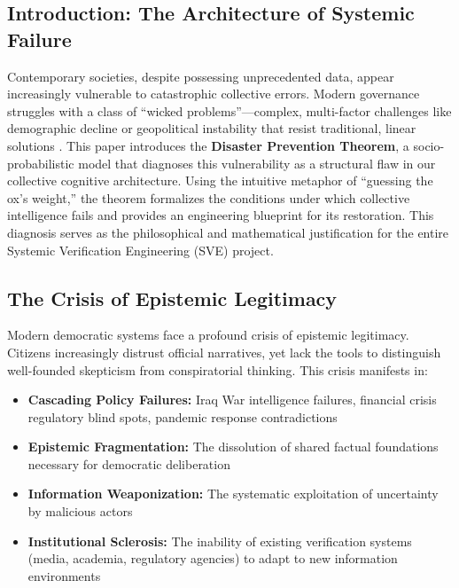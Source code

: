 \documentclass[11pt,a4paper]{article}
\begin{document}
\begin{small}

\section{Introduction: The Architecture of Systemic Failure}

Contemporary societies, despite possessing unprecedented data, appear increasingly vulnerable to catastrophic collective errors. Modern governance struggles with a class of ``wicked problems''---complex, multi-factor challenges like demographic decline or geopolitical instability that resist traditional, linear solutions \citep{Rittel1973}. This paper introduces the \textbf{Disaster Prevention Theorem}, a socio-probabilistic model that diagnoses this vulnerability as a structural flaw in our collective cognitive architecture. Using the intuitive metaphor of ``guessing the ox's weight,'' the theorem formalizes the conditions under which collective intelligence fails and provides an engineering blueprint for its restoration. This diagnosis serves as the philosophical and mathematical justification for the entire Systemic Verification Engineering (SVE) project.

\subsection{The Crisis of Epistemic Legitimacy}

Modern democratic systems face a profound crisis of epistemic legitimacy. Citizens increasingly distrust official narratives, yet lack the tools to distinguish well-founded skepticism from conspiratorial thinking. This crisis manifests in:

\begin{itemize}
    \item \textbf{Cascading Policy Failures:} Iraq War intelligence failures, financial crisis regulatory blind spots, pandemic response contradictions
    \item \textbf{Epistemic Fragmentation:} The dissolution of shared factual foundations necessary for democratic deliberation
    \item \textbf{Information Weaponization:} The systematic exploitation of uncertainty by malicious actors
    \item \textbf{Institutional Sclerosis:} The inability of existing verification systems (media, academia, regulatory agencies) to adapt to new information environments
\end{itemize}


\end{small}
\end{document}
